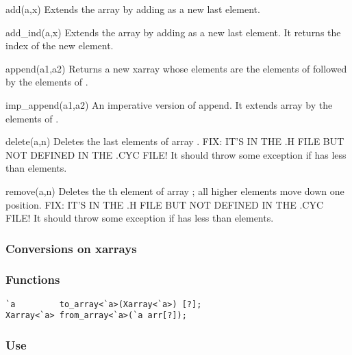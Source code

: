 \begin{defun}{add}{(a,x)}
Extends the array  by adding  as a new last element.
\end{defun}

\begin{defun}{add_ind}{(a,x)}
Extends the array  by adding  as a new last element.  It
returns the index of the new element.
\end{defun}

\begin{defun}{append}{(a1,a2)}
Returns a new xarray whose elements are the elements of 
followed by the elements of .
\end{defun}

\begin{defun}{imp_append}{(a1,a2)}
An imperative version of append.  It extends array  by the
elements of .
\end{defun}

\begin{defun}{delete}{(a,n)}
Deletes the last  elements of array .  FIX: IT'S IN THE .H
FILE BUT NOT DEFINED IN THE .CYC FILE!  It should throw some exception
if  has less than  elements.
\end{defun}


\begin{defun}{remove}{(a,n)}
Deletes the th element of array ; all higher elements move
down one position.  FIX: IT'S IN THE .H FILE BUT NOT DEFINED IN THE .CYC
FILE!  It should throw some exception if  has less than 
elements.
\end{defun}

\subsubsection*{Conversions on xarrays}
\subsubsection*{Functions}
\begin{verbatim}
`a         to_array<`a>(Xarray<`a>) [?];
Xarray<`a> from_array<`a>(`a arr[?]);
\end{verbatim}

\subsubsection*{Use}


